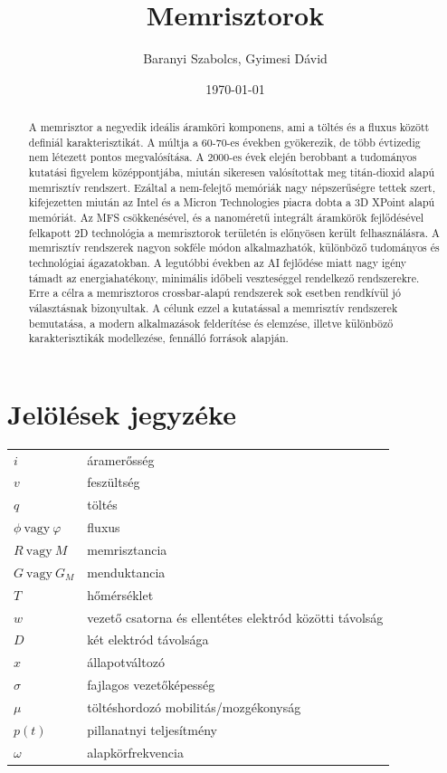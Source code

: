 \documentclass[twoside]{article}
\title{Memrisztorok}
\author{Baranyi Szabolcs, Gyimesi Dávid}
\date{\today}
\begin{document}
\maketitle\thispagestyle{fancy}
\begin{abstract}
A memrisztor a negyedik ideális áramköri komponens, ami a töltés és a fluxus között definiál karakterisztikát. A múltja a 60-70-es években gyökerezik, de több évtizedig nem létezett pontos megvalósítása. A 2000-es évek elején berobbant a tudományos kutatási figyelem középpontjába, miután sikeresen valósítottak meg titán-dioxid alapú memrisztív rendszert. Ezáltal a nem-felejtő memóriák nagy népszerűségre tettek szert, kifejezetten miután az Intel és a Micron Technologies piacra dobta a 3D XPoint alapú memóriát. Az MFS csökkenésével, és a nanoméretű integrált áramkörök fejlődésével felkapott 2D technológia a memrisztorok területén is előnyösen került felhasználásra. A memrisztív rendszerek nagyon sokféle módon alkalmazhatók, különböző tudományos és technológiai ágazatokban. A legutóbbi években az AI fejlődése miatt nagy igény támadt az energiahatékony, minimális időbeli veszteséggel rendelkező rendszerekre. Erre a célra a memrisztoros crossbar-alapú rendszerek sok esetben rendkívül jó választásnak bizonyultak. A célunk ezzel a kutatással a memrisztív rendszerek bemutatása, a modern alkalmazások felderítése és elemzése, illetve különböző karakterisztikák modellezése, fennálló források alapján. 
\end{abstract}
\vspace{5mm}
\tableofcontents
\newpage
\section*{Jelölések jegyzéke}
\begin{tabular}{p{2cm} p{20cm}}
	$i$ & áramerősség \\
	$v$ & feszültség \\
	$q$ & töltés \\
	$\phi\:\text{vagy}\:\varphi$ & fluxus \\
	$R\:\text{vagy}\:M$ & memrisztancia \\
	$G\:\text{vagy}\:G_M$ & menduktancia \\
	$T$ & hőmérséklet \\
	$w$ & vezető csatorna és ellentétes elektród közötti távolság \\
	$D$ & két elektród távolsága \\
	$x$ & állapotváltozó \\
	$\sigma$ & fajlagos vezetőképesség \\
	$\mu$ & töltéshordozó mobilitás/mozgékonyság \\
	$p(t)$ & pillanatnyi teljesítmény \\
	$\omega$ & alapkörfrekvencia
\end{tabular}
\newpage
\end{document}
